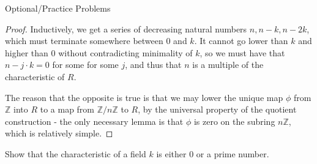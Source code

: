 \documentclass[12pt]{article}
\newcommand{\Z}{\mathbb{Z}}
\theoremstyle{definition}
\newenvironment{problem}[2][Problem]{\begin{trivlist}
\item[\hskip \labelsep {\bfseries #1}\hskip \labelsep {\bfseries #2.}]}{\end{trivlist}}
\begin{document}
\begin{section}{Optional/Practice Problems}
\begin{proof}
		Inductively, we get a series of decreasing natural numbers $n, n-k, n-2k$, which must terminate somewhere between $0$ and $k$. It cannot go lower than $k$ and higher than 0 without contradicting minimality of $k$, so we must have that $n - j \cdot k = 0$ for some for some $j$, and thus that $n$ is a multiple of the characteristic of $R$.
		\par The reason that the opposite is true is that we may lower the unique map $\phi$ from $\Z$ into $R$ to a map from $\Z/n\Z$ to $R$, by the universal property of the quotient construction - the only necessary lemma is that $\phi$ is zero on the subring $n\Z$, which is relatively simple.
	\end{proof}
	\begin{problem}{2b}
		Show that the characteristic of a field $k$ is either $0$ or a prime number.
		

\end{problem}
\end{section}
\end{document}
